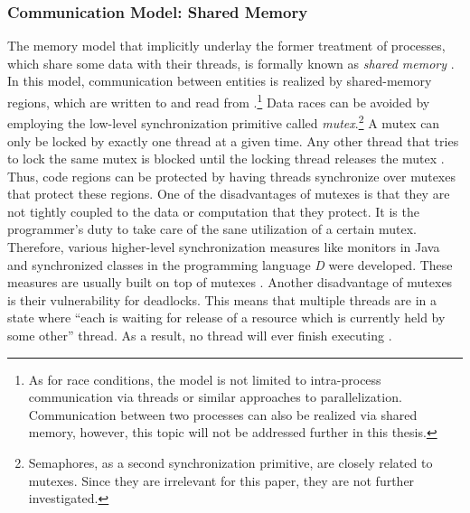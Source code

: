 \subsubsection{Communication Model: Shared Memory}
The memory model that implicitly underlay the former treatment of processes, which share some data with their threads, is formally known as \textit{shared memory} . In this model, communication between entities is realized by shared-memory regions, which are written to and read from \cite[p.~138]{OperatingSystems_by_Haldar}.\footnote{As for race conditions, the model is not limited to intra-process communication via threads or similar approaches to parallelization. Communication between two processes can also be realized via shared memory, however, this topic will not be addressed further in this thesis.} Data races can be avoided by employing the low-level synchronization primitive called \textit{mutex}.\footnote{Semaphores, as a second synchronization primitive, are closely related to mutexes. Since they are irrelevant for this paper, they are not further investigated.} A mutex can only be locked by exactly one thread at a given time. Any other thread that tries to lock the same mutex is blocked until the locking thread releases the mutex \cite{AdvancedLinuxProgramming}. Thus, code regions can be protected by having threads synchronize over mutexes that protect these regions. One of the disadvantages of mutexes is that they are not tightly coupled to the data or computation that they protect. It is the programmer's duty to take care of the sane utilization of a certain mutex. Therefore, various higher-level synchronization measures like monitors in Java \cite[p.~42]{ConcurrentAndDistributedComputingInJava} and synchronized classes in the programming language \textit{D} \cite{TheDProgrammingLanguage} were developed. These measures are usually built on top of mutexes \cite[p.~25]{TamingJavaThreads}. Another disadvantage of mutexes is their vulnerability for deadlocks. This means that multiple threads are in a state where ``each is waiting for release of a resource which is currently held by some other'' \cite[p.~119]{IntroductionToOperatingSystems} thread. As a result, no thread will ever finish executing \cite[p.~2-3]{OperatingSystems_by_Dhotre}.

